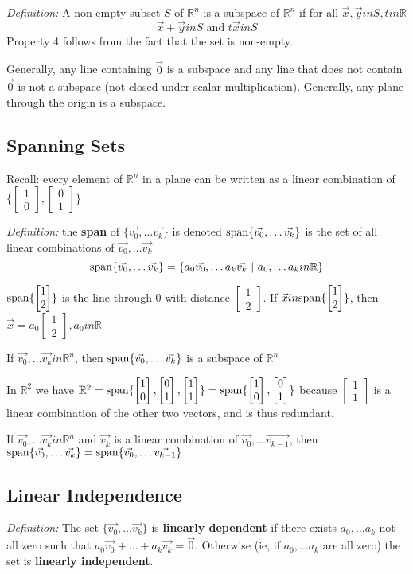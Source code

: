 \documentclass[12pt]{article}
\newcommand{\R}[1]{\mathbb{R}^{#1}}
\newcommand{\spanv}[1]{{\rm span}\{#1\}}
\newcommand{\vectwo}[2]{\begin{bmatrix}#1\\#2\end{bmatrix}}
\begin{document}
\textit{Definition:} A non-empty subset $S$ of $\R{n}$ is a subspace of $\R{n}$ if for all $\vec{x},\vec{y}in S, tin\mathbb{R}$ \[ \vec{x}+\vec{y}in S \text{ and } t\vec{x}in S \] Property 4 follows from the fact that the set is non-empty.

Generally, any line containing $\vec{0}$ is a subspace and any line that does not contain $\vec{0}$ is not a subspace (not closed under scalar multiplication). Generally, any plane through the origin is a subspace.

\subsection*{Spanning Sets}
Recall: every element of $\R{n}$ in a plane can be written as a linear combination of $\{\vectwo{1}{0},\vectwo{0}{1}\}$

\textit{Definition:} the {\bf span} of $\{\vec{v_0},\dots \vec{v_k}\}$ is denoted $\spanv{\vec{v_0},\dots \vec{v_k}}$ is the set of all linear combinations of $\vec{v_0},\dots \vec{v_k}$ \[\spanv{\vec{v_0},\dots \vec{v_k}} = \{a_0\vec{v_0},\dots a_k\vec{v_k}\suchthat a_0,\dots a_kin\mathbb{R}\} \]

$\spanv{\vectwo{1}{2}}$ is the line through $0$ with distance $\vectwo{1}{2}$. If $\vec{x}in\spanv{\vectwo{1}{2}}$, then $\vec{x} = a_0\vectwo{1}{2}, a_0in\mathbb{R}$

\begin{theorem}
If $\vec{v_0},\dots \vec{v_k}in\R{n}$, then $\spanv{\vec{v_0},\dots \vec{v_k}}$ is a subspace of $\R{n}$
\end{theorem}

In $\R{2}$ we have $\R{2} = \spanv{\vectwo{1}{0},\vectwo{0}{1},\vectwo{1}{1}} = \spanv{\vectwo{1}{0},\vectwo{0}{1}}$ because $\vectwo{1}{1}$ is a linear combination of the other two vectors, and is thus redundant.

\begin{theorem}
If $\vec{v_0},\dots \vec{v_k}in\R{n}$ and $\vec{v_k}$ is a linear combination of $\vec{v_0},\dots \vec{v_{k-1}}$, then $\spanv{\vec{v_0},\dots \vec{v_k}} = \spanv{\vec{v_0},\dots \vec{v_{k-1}}}$
\end{theorem}

\subsection*{Linear Independence}
\textit{Definition:} The set $\{\vec{v_0},\dots \vec{v_k}\}$ is {\bf linearly dependent} if there exists $a_0,\dots a_k$ not all zero such that $a_0\vec{v_0} + \dots + a_k\vec{v_k} = \vec{0}$. Otherwise (ie, if $a_0,\dots a_k$ are all zero) the set is {\bf linearly independent}.
\end{document}
